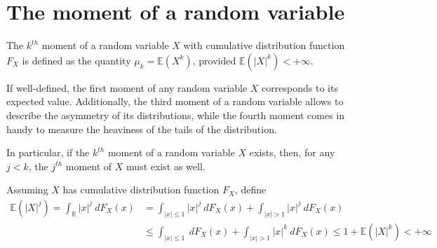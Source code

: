 \documentclass{report}
\begin{document}
\section{The moment of a random variable}
The $\displaystyle k^{th}$ moment of a random variable $\displaystyle X$ with cumulative distribution function $\displaystyle F_X$ is defined as the quantity $\displaystyle \mu_k = \mathbb{E}(X^k)$, provided $\displaystyle \mathbb{E}(|X|^k) < +\infty$.
\begin{examplebox}
    If well-defined, the first moment of any random variable $\displaystyle X$ corresponds to its expected value. \newline
    Additionally, the third moment of a random variable allows to describe the asymmetry of its distributions, while the fourth moment comes in handy to measure the heaviness of the tails of the distribution.
\end{examplebox}
\noindent In particular, if the $\displaystyle k^{th}$ moment of a random variable $\displaystyle X$ exists, then, for any $\displaystyle j < k$, the $\displaystyle j^{th}$ moment of $\displaystyle X$ must exist as well.
\begin{proofbox}
    Assuming $\displaystyle X$ has cumulative distribution function $\displaystyle F_X$, define
    \begin{align*}
        \mathbb{E}(|X|^j) = \int_{\mathbb{R}} |x|^j \ dF_X(x)
            &= \int_{|x| \leq 1} |x|^j \ dF_X(x) + \int_{|x| > 1} |x|^j \ dF_X(x) \\
            &\leq \int_{|x| \leq 1} \ dF_X(x) + \int_{|x| > 1} |x|^k \ dF_X(x) \leq 1 + \mathbb{E}(|X|^k) < +\infty
    \end{align*}
\end{proofbox}
\end{document}
